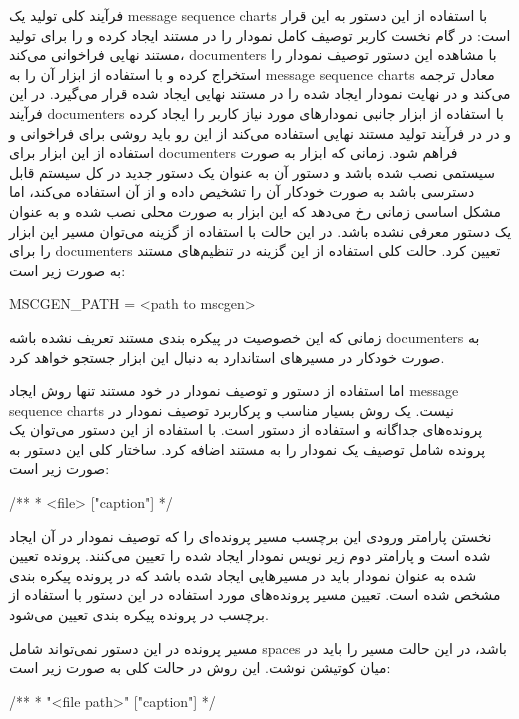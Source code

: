 فرآیند کلی تولید یک \glspl{message sequence chart} با استفاده از این دستور به
این قرار است: در گام نخست کاربر توصیف کامل نمودار را در مستند ایجاد کرده و
 را برای تولید مستند نهایی فراخوانی می‌کند، \glspl{documenter} با
مشاهده این دستور توصیف نمودار را استخراج کرده و با استفاده از ابزار 
آن را به \glspl{message sequence chart} معادل ترجمه می‌کند و در نهایت نمودار
ایجاد شده را در مستند نهایی ایجاد شده قرار می‌گیرد. در این فرآیند
\glspl{documenter} با استفاده از ابزار جانبی  نمودارهای مورد نیاز
کاربر را ایجاد کرده و در در فرآیند تولید مستند نهایی استفاده می‌کند از این رو
باید روشی برای فراخوانی و استفاده از این ابزار برای \glspl{documenter} فراهم
شود. زمانی که ابزار  به صورت سیستمی نصب شده باشد و دستور آن به عنوان
یک دستور جدید در کل سیستم قابل دسترسی باشد  به صورت خودکار آن را
تشخیص داده و از آن استفاده می‌کند، اما مشکل اساسی زمانی رخ می‌دهد که این ابزار
به صورت محلی نصب شده و به عنوان یک دستور معرفی نشده باشد. در این حالت با استفاده
از گزینه  می‌توان مسیر این ابزار را برای \glspl{documenter}
تعیین کرد. حالت کلی استفاده از این گزینه در تنظیم‌های مستند به صورت زیر است:

\begin{Shell}
MSCGEN_PATH = <path to mscgen>
\end{Shell}

زمانی که این خصوصیت در پیکره بندی مستند تعریف نشده باشه \glspl{documenter} به
صورت خودکار در مسیرهای استاندارد به دنبال این ابزار جستجو خواهد کرد.

اما استفاده از دستور  و توصیف نمودار در خود مستند تنها روش ایجاد
\glspl{message sequence chart} نیست. یک روش بسیار مناسب و پرکاربرد توصیف نمودار
در پرونده‌های جداگانه و استفاده از دستور  است. با استفاده از این
دستور می‌توان یک پرونده شامل توصیف یک نمودار را به مستند اضافه کرد. ساختار کلی
این دستور به صورت زیر است:

\begin{C++}
 /**
  * \mscfile <file> ["caption"]
  */
\end{C++}

نخستن پارامتر ورودی این برچسب مسیر پرونده‌ای را که توصیف نمودار در
آن ایجاد شده است و پارامتر دوم زیر نویس نمودار ایجاد شده را تعیین
می‌کنند. پرونده تعیین شده به عنوان نمودار باید در مسیرهایی ایجاد شده باشد که در
پرونده پیکره بندی مشخص شده است. تعیین مسیر پرونده‌های مورد استفاده در این دستور
با استفاده از برچسب  در پرونده پیکره بندی تعیین می‌شود.

\begin{note}
مسیر پرونده در این دستور نمی‌تواند شامل \glspl{space} باشد، در این حالت مسیر را
باید در میان کوتیشن نوشت. این روش در حالت کلی به صورت زیر است:
\begin{C++}
 /**
  * \mscfile "<file path>" ["caption"]
  */
\end{C++}
\end{note}

